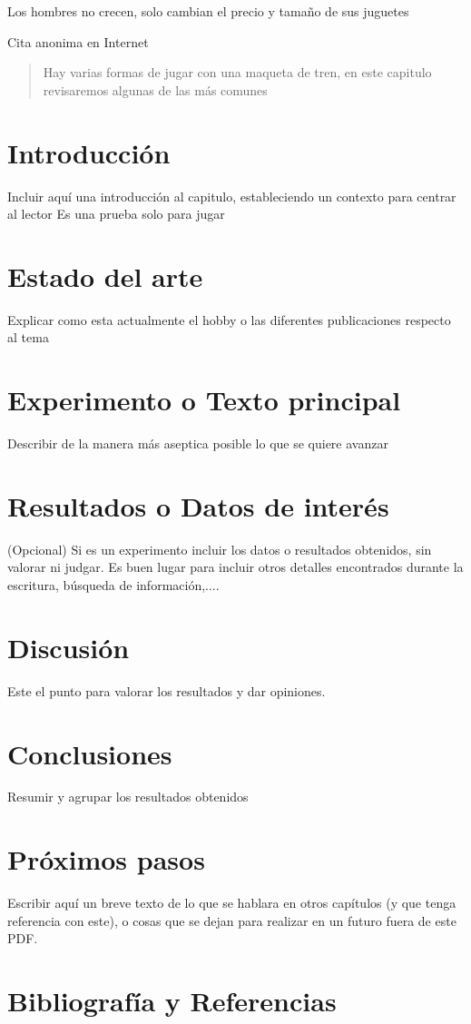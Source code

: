 

\epigraph{Los hombres no crecen, solo cambian el precio y tamaño de sus juguetes}{Cita anonima en Internet}

\begin{abstract}
Hay varias formas de jugar con una maqueta de tren, en este capitulo revisaremos algunas de las más comunes
\end{abstract}

\section{Introducción}
Incluir aquí una introducción al capitulo, estableciendo un contexto para centrar al lector
\cite{ackerberg2006} Es una prueba solo para jugar

\section{Estado del arte}
Explicar como esta actualmente el hobby o las diferentes publicaciones respecto al tema
\section{Experimento o Texto principal}
Describir de la manera más aseptica posible lo que se quiere avanzar
\section{Resultados o Datos de interés}(Opcional) 
Si es un experimento incluir los datos o resultados obtenidos, sin valorar ni judgar. Es buen lugar para incluir otros detalles encontrados durante la escritura, búsqueda de información,....
\section{Discusión}
Este el punto para valorar los resultados y dar opiniones.
\section{Conclusiones}
Resumir y agrupar los resultados obtenidos
\section{Próximos pasos}
Escribir aquí un breve texto de lo que se hablara en otros capítulos (y que tenga referencia con este), o cosas que se dejan para realizar en un futuro fuera de este PDF.
\section{Bibliografía y Referencias}
\printbibliography[heading=subbibliography]